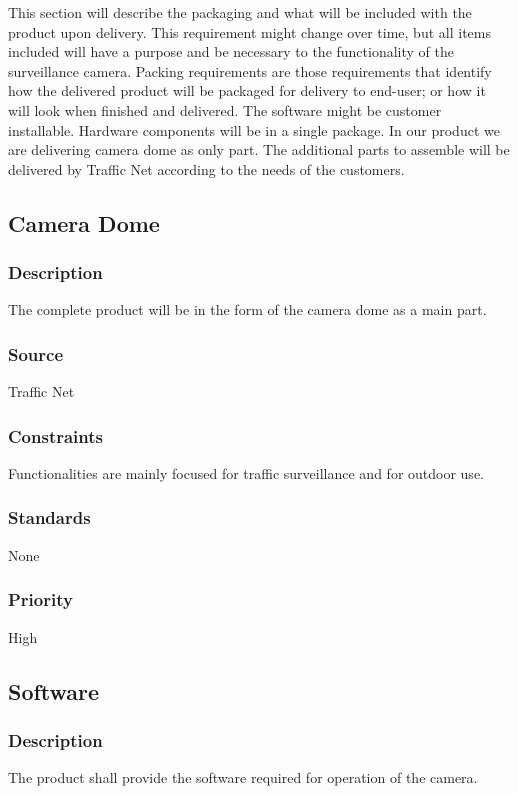 This section will describe the packaging and what will be included with the product upon delivery. This requirement might change over time, but all items included will have a purpose and be necessary to the functionality of the surveillance camera. Packing requirements are those requirements that identify how the delivered product will be packaged for delivery to end-user; or how it will look when finished and delivered. The software might be customer installable. Hardware components will be in a single package. In our product we are delivering camera dome as only part. The additional parts to assemble will be delivered by Traffic Net according to the needs of the customers.


\subsection{Camera Dome}
\subsubsection{Description}
The complete product will be in the form of the camera dome as a main part.

\subsubsection{Source}
Traffic Net

\subsubsection{Constraints}
Functionalities are mainly focused for traffic surveillance and for outdoor use.

\subsubsection{Standards}
None

\subsubsection{Priority}
High

\subsection{Software}
\subsubsection{Description}
The product shall provide the software required for operation of the camera.

